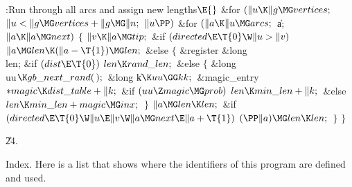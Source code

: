 \B{}:Run through all arcs and assign new lengths\X${}\E{}$\6
\&{for} ${}(\|u\K\|g\MG\\{vertices};{}$ ${}\|u<\|g\MG\\{vertices}+\|g\MG\|n;{}$
${}\|u\PP){}$\1\6
\&{for} ${}(\|a\K\|u\MG\\{arcs};{}$ \|a; ${}\|a\K\|a\MG\\{next}){}$\5
${}\{{}$\1\6
${}\|v\K\|a\MG\\{tip};{}$\6
\&{if} ${}(\\{directed}\E\T{0}\W\|u>\|v){}$\1\5
${}\|a\MG\\{len}\K(\|a-\T{1})\MG\\{len};{}$\2\6
\&{else}\5
${}\{{}$\5
\1\&{register} \&{long} \\{len};\7
\&{if} ${}(\\{dist}\E\T{0}){}$\1\5
${}\\{len}\K\\{rand\_len};{}$\2\6
\&{else}\5
${}\{{}$\5
\1\&{long} \\{uu}${}\K\\{gb\_next\_rand}(\,);{}$\6
\&{long} \|k${}\K\\{uu}\GG\\{kk};{}$\6
\&{magic\_entry} ${}{*}\\{magic}\K\\{dist\_table}+\|k;{}$\7
\&{if} ${}(\\{uu}\Z\\{magic}\MG\\{prob}){}$\1\5
${}\\{len}\K\\{min\_len}+\|k;{}$\2\6
\&{else}\1\5
${}\\{len}\K\\{min\_len}+\\{magic}\MG\\{inx};{}$\2\6
\4${}\}{}$\2\6
${}\|a\MG\\{len}\K\\{len};{}$\6
\&{if} ${}(\\{directed}\E\T{0}\W\|u\E\|v\W\|a\MG\\{next}\E\|a+\T{1}){}$\1\5
${}(\PP\|a)\MG\\{len}\K\\{len};{}$\2\6
\4${}\}{}$\2\6
\4${}\}{}$\2\2\par
\U24.\fi

Index. Here is a list that shows where the identifiers of this program
are
defined and used.
\fi

\inx
\fin
\con
